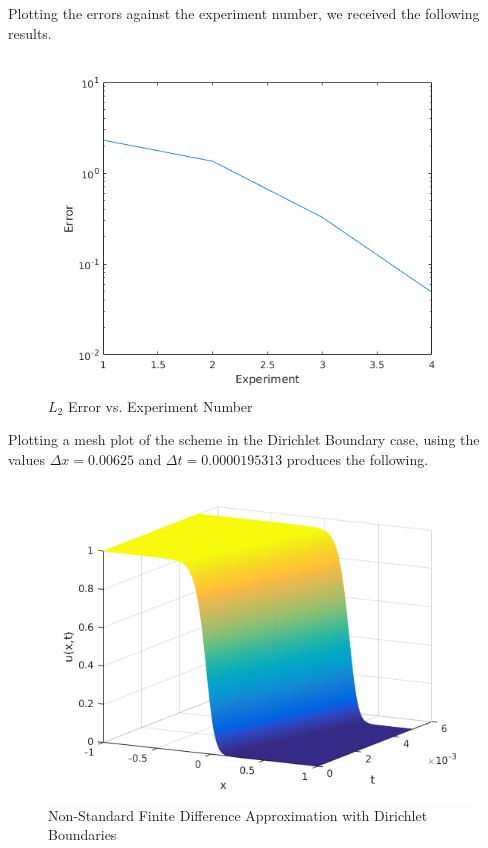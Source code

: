 \documentclass[a4paper]{article}
\begin{document}
	Plotting the errors against the experiment number, we received the following results.
    \begin{figure}[H]
    \caption{$L_{2}$ Error vs. Experiment Number}
    \includegraphics[scale=0.5]{ErrorNSFD.png}
    \end{figure}
	
    Plotting a mesh plot of the scheme in the Dirichlet Boundary case, using the values $\Delta x = 0.00625$ and $\Delta t = 0.0000195313$ produces the following.
    \begin{figure}[H]
    \caption{Non-Standard Finite Difference Approximation with Dirichlet Boundaries}
    \includegraphics[scale=0.7]{Fisher_Dirichlet_NSFD.png}
    \end{figure}
	
\end{document}
